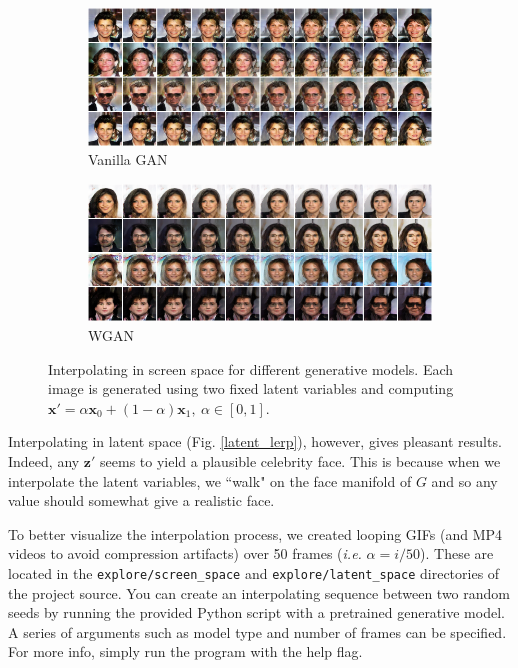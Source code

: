 \documentclass[table]{article}
\def\*#1{\mathbf{#1}}
\newcommand{\code}[1]{{\color{Blue}\small\texttt{#1}}}
\begin{document}
\begin{figure}[ht]
  \centering
  \begin{subfigure}{\textwidth}
    \centering
    \includegraphics[scale=0.5]{imgs/gan_screen_lerp}
    \caption{Vanilla GAN}
  \end{subfigure}

  \vspace*{3mm}
  \begin{subfigure}{\textwidth}
    \centering
    \includegraphics[scale=0.5]{imgs/wgan_screen_lerp}
    \caption{WGAN}
  \end{subfigure}
  \caption{Interpolating in screen space for different generative models. Each image is generated using two fixed latent variables and computing $\*x' = \alpha \*x_0 + (1-\alpha)\*x_1, \ \alpha \in [0,1]$.}
  \label{screen_lerp}
\end{figure}

Interpolating in latent space (Fig. \ref{latent_lerp}), however, gives pleasant results. Indeed, any $\*z'$ seems to yield a plausible celebrity face. This is because when we interpolate the latent variables, we ``walk" on the face manifold of $G$ and so any value should somewhat give a realistic face.

To better visualize the interpolation process, we created looping GIFs (and MP4 videos to avoid compression artifacts) over 50 frames (\textit{i.e.} $\alpha = i/50$). These are located in the \code{explore/screen\_space} and \code{explore/latent\_space} directories of the project source. You can create an interpolating sequence between two random seeds by running the provided Python script with a pretrained generative model. A series of arguments such as model type and number of frames can be specified. For more info, simply run the program with the help flag.
\end{document}
